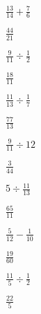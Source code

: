 \documentclass[12pt]{exam}
\begin{document}
\begin{questions}
\begin{multicols}{2}
            \question $\frac{13}{14} + \frac{7}{6}$

            \begin{solution}

                $\frac{44}{21}$

            \end{solution}


            \question $\frac{9}{11} \div \frac{1}{2}$

            \begin{solution}

                $\frac{18}{11}$

            \end{solution}


            \question $\frac{11}{13} \div \frac{1}{7}$

            \begin{solution}

                $\frac{77}{13}$

            \end{solution}


            \question $\frac{9}{11} \div 12$

            \begin{solution}

                $\frac{3}{44}$

            \end{solution}


            \question $5 \div \frac{11}{13}$

            \begin{solution}

                $\frac{65}{11}$

            \end{solution}


            \question $\frac{5}{12} - \frac{1}{10}$

            \begin{solution}

                $\frac{19}{60}$

            \end{solution}


            \question $\frac{11}{5} \div \frac{1}{2}$

            \begin{solution}

                $\frac{22}{5}$

            \end{solution}



\end{multicols}
\end{questions}
\end{document}
